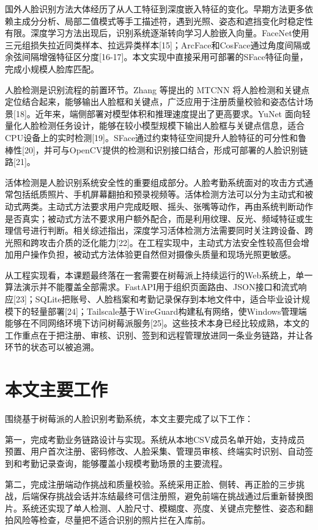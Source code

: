 \documentclass[UTF8]{heuthesis}
\begin{document}
国外人脸识别方法大体经历了从人工特征到深度嵌入特征的变化。早期方法更多依赖主成分分析、局部二值模式等手工描述符，遇到光照、姿态和遮挡变化时稳定性有限。深度学习方法出现后，识别系统逐渐转向学习人脸嵌入向量。FaceNet使用三元组损失拉近同类样本、拉远异类样本[15]；ArcFace和CosFace通过角度间隔或余弦间隔增强特征区分度[16-17]。本文实现中直接采用可部署的SFace特征向量，完成小规模人脸库匹配。

人脸检测是识别流程的前置环节。Zhang 等提出的 MTCNN 将人脸检测和关键点定位结合起来，能够输出人脸框和关键点，广泛应用于注册质量校验和姿态估计场景[18]。近年来，端侧部署对模型体积和推理速度提出了更高要求。YuNet 面向轻量化人脸检测任务设计，能够在较小模型规模下输出人脸框与关键点信息，适合CPU设备上的实时检测[19]。SFace通过约束特征空间提升人脸特征的可分性和鲁棒性[20]，并可与OpenCV提供的检测和识别接口结合，形成可部署的人脸识别链路[21]。

活体检测是人脸识别系统安全性的重要组成部分。人脸考勤系统面对的攻击方式通常包括纸质照片、手机屏幕翻拍和预录视频等。活体检测方法可以分为主动式和被动式两类。主动式方法要求用户完成眨眼、摇头、张嘴等动作，再由系统判断动作是否真实；被动式方法不要求用户额外配合，而是利用纹理、反光、频域特征或生理信号进行判断。相关综述指出，深度学习活体检测方法需要同时关注跨设备、跨光照和跨攻击介质的泛化能力[22]。在工程实现中，主动式方法安全性较高但会增加用户操作负担，被动式方法体验更自然但对摄像头质量和现场光照更敏感。

从工程实现看，本课题最终落在一套需要在树莓派上持续运行的Web系统上，单一算法演示并不能覆盖全部需求。FastAPI用于组织页面路由、JSON接口和流式响应[23]；SQLite把账号、人脸档案和考勤记录保存到本地文件中，适合毕业设计规模下的轻量部署[24]；Tailscale基于WireGuard构建私有网络，使Windows管理端能够在不同网络环境下访问树莓派服务[25]。这些技术本身已经比较成熟，本文的工作重点在于把注册、审核、识别、签到和远程管理放进同一条业务链路，并让各环节的状态可以被追溯。

\section{本文主要工作}
围绕基于树莓派的人脸识别考勤系统，本文主要完成了以下工作：

第一，完成考勤业务链路设计与实现。系统从本地CSV成员名单开始，支持成员预置、用户首次注册、密码修改、人脸采集、管理员审核、终端实时识别、自动签到和考勤记录查询，能够覆盖小规模考勤场景的主要流程。

第二，完成注册端动作挑战和质量校验。系统采用正脸、侧转、再正脸的三步挑战，后端保存挑战会话并冻结最终可信注册照，避免前端在挑战通过后重新替换图片。系统还实现了单人检测、人脸尺寸、模糊度、亮度、关键点完整性、姿态和翻拍风险等检查，尽量把不适合识别的照片拦在入库前。
\end{document}
